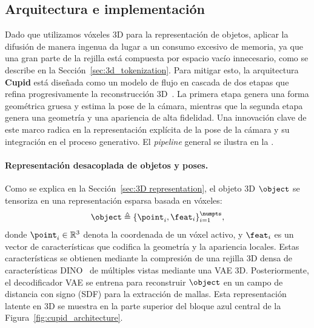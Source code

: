 \documentclass[../../book-main_es.tex]{subfiles}
\begin{document}
\subsection{Arquitectura e implementación}
\label{sub:3d_reconstruction_architecture}
Dado que utilizamos vóxeles 3D para la representación de objetos, aplicar la difusión de 
manera ingenua da lugar a un consumo excesivo de memoria, ya que una gran parte de la 
rejilla está compuesta por espacio vacío innecesario, como se describe en la 
Sección~\ref{sec:3d_tokenization}. Para mitigar esto, la arquitectura \textbf{Cupid} está 
diseñada como un modelo de flujo en cascada de dos etapas que refina progresivamente la 
reconstrucción 3D~\citep{xiang2025structured}. La primera etapa genera una forma geométrica 
gruesa y estima la pose de la cámara, mientras que la segunda etapa genera una 
geometría y una apariencia de alta fidelidad. Una innovación clave de este marco radica en 
la representación explícita de la pose de la cámara y su integración en el proceso 
generativo. El \textit{pipeline} general se ilustra en la .

\paragraph{Representación desacoplada de objetos y poses.}

Como se explica en la Sección~\ref{sec:3D representation}, el objeto 3D $\object$ se 
tensoriza en una representación esparsa basada en vóxeles:
\begin{equation}
    \object \triangleq \{\point_i, \feat_i\}_{i=1}^{\numpts},
\end{equation}
donde $\point_i \in \mathbb{R}^3$ denota la coordenada de un vóxel activo, y $\feat_i$ es 
un vector de características que codifica la geometría y la apariencia locales. Estas 
características se obtienen mediante la compresión de una rejilla 3D densa de características 
DINO~\citep{oquab2023dinov2} de múltiples vistas mediante una VAE 3D. Posteriormente, el 
decodificador VAE se entrena para reconstruir $\object$ en un campo de distancia con signo 
(SDF) para la extracción de mallas. Esta representación latente en 3D se muestra en la parte 
superior del bloque azul central de la Figura~\ref{fig:cupid_architecture}.
\end{document}

